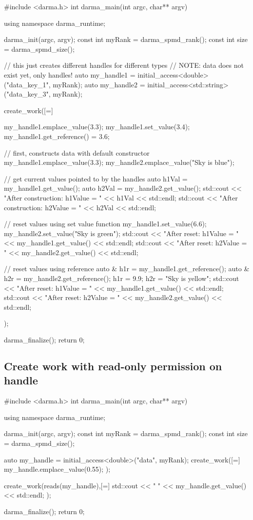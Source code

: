 \begin{CppCodeNumb}
#include <darma.h>
int darma_main(int argc, char** argv)
{
  using namespace darma_runtime;

  darma_init(argc, argv);
  const int myRank = darma_spmd_rank();
  const int size = darma_spmd_size();

  // this just creates different handles for different types
  // NOTE: data does not exist yet, only handles!
  auto my_handle1 = initial_access<double>("data_key_1", myRank);
  auto my_handle2 = initial_access<std::string>("data_key_3", myRank);

  create_work([=]
  {
    my_handle1.emplace_value(3.3);
    my_handle1.set_value(3.4);
    my_handle1.get_reference() = 3.6;

    // first, constructs data with default constructor
    my_handle1.emplace_value(3.3);
    my_handle2.emplace_value("Sky is blue");

    // get current values pointed to by the handles
    auto h1Val = my_handle1.get_value();
    auto h2Val = my_handle2.get_value();
    std::cout << "After construction: h1Value = " << h1Val << std::endl;
    std::cout << "After construction: h2Value = " << h2Val << std::endl;

    // reset values using set value function
    my_handle1.set_value(6.6);
    my_handle2.set_value("Sky is green");
    std::cout << "After reset: h1Value = " << my_handle1.get_value() << std::endl;
    std::cout << "After reset: h2Value = " << my_handle2.get_value() << std::endl;

    // reset values using reference
    auto & h1r = my_handle1.get_reference();
    auto & h2r = my_handle2.get_reference();
    h1r = 9.9;
    h2r = "Sky is yellow";
    std::cout << "After reset: h1Value = " << my_handle1.get_value() << std::endl;
    std::cout << "After reset: h2Value = " << my_handle2.get_value() << std::endl;

  });

  darma_finalize();
  return 0;
}
\end{CppCodeNumb}




\subsection{Create work with read-only permission on handle}

\begin{CppCodeNumb}
#include <darma.h>
int darma_main(int argc, char** argv)
{
  using namespace darma_runtime;

  darma_init(argc, argv);
  const int myRank = darma_spmd_rank();
  const int size = darma_spmd_size();

  auto my_handle = initial_access<double>("data", myRank);
  create_work([=]
  {
    my_handle.emplace_value(0.55);
  });

  create_work(reads(my_handle),[=]
  {
    std::cout << " " << my_handle.get_value() << std::endl;
  });

  darma_finalize();
  return 0;
}
\end{CppCodeNumb}






